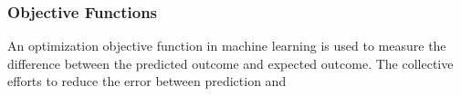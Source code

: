 \subsubsection{Objective Functions}
An optimization objective function in machine learning is used to measure the difference between the predicted outcome and expected outcome. The collective efforts to reduce the error between prediction and 